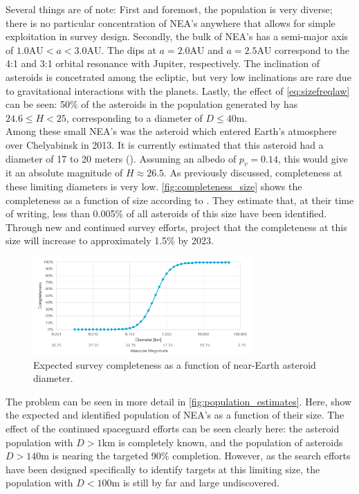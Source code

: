 Several things are of note: First and foremost, the population is very diverse; there is no particular concentration of NEA's anywhere that allows for simple exploitation in survey design. Secondly, the bulk of NEA's has a semi-major axis of $1.0 \mathrm{AU} < a < 3.0 \mathrm{AU}$. The dips at $a = 2.0 \mathrm{AU}$ and $a = 2.5 \mathrm{AU}$ correspond to the 4:1 and 3:1 orbital resonance with Jupiter, respectively. The inclination of asteroids is concetrated among the ecliptic, but very low inclinations are rare due to gravitational interactions with the planets. Lastly, the effect of \autoref{eq:sizefreqlaw} can be seen: 50\% of the asteroids in the population generated by \cite{GranvikPopulation} has $24.6 \leq H < 25$, corresponding to a diameter of $D \leq 40 \mathrm{m}$. \\

Among these small NEA's was the asteroid which entered Earth's atmosphere over Chelyabinsk in 2013. It is currently estimated that this asteroid had a diameter of 17 to 20 meters (\cite{ChelyabinskNASA}). Assuming an albedo of $p_v = 0.14$, this would give it an absolute magnitude of $H \approx 26.5$. As previously discussed, completeness at these limiting diameters is very low. \autoref{fig:completeness_size} shows the completeness as a function of size according to \cite{HarrisPopulation}. They estimate that, at their time of writing, less than 0.005\% of all asteroids of this size have been identified. Through new and continued survey efforts, \cite{2017NEOSDT} project that the completeness at this size will increase to approximately 1.5\% by 2023. \\

\begin{figure}[htbp]
 \centering
 \includegraphics[width=0.75\textwidth]{img/completeness_size.png}
 \caption{Expected survey completeness as a function of near-Earth asteroid diameter. \cite{HarrisPopulation}}
 \label{fig:completeness_size}
\end{figure}

The problem can be seen in more detail in \autoref{fig:population_estimates}. Here, \cite{HarrisPopulation} show the expected and identified population of NEA's as a function of their size. The effect of the continued spaceguard efforts can be seen clearly here: the asteroid population with $D > 1 \mathrm{km}$ is completely known, and the population of asteroids $D > 140 \mathrm{m}$ is nearing the targeted 90\% completion. However, as the search efforts have been designed specifically to identify targets at this limiting size, the population with $D < 100 \mathrm{m}$ is still by far and large undiscovered.

